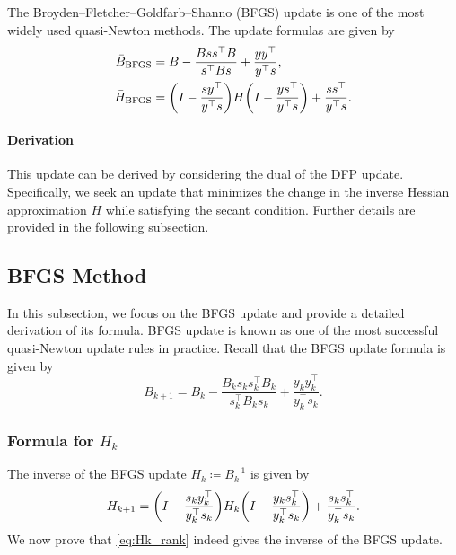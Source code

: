 \documentclass[0_en]{subfiles}
\begin{document}
The Broyden--Fletcher--Goldfarb--Shanno (BFGS) update is one of the most widely used quasi-Newton methods. The update formulas are given by
\begin{align}
    \bar{B}_{\mathrm{BFGS}} & = B - \frac{B s s^\top B}{s^\top B s} + \frac{y y^\top}{y^\top s}, \label{eq:bfgs-b-update-brief}                                       \\
    \bar{H}_{\mathrm{BFGS}} & = \qty(I - \frac{s y^\top}{y^\top s}) H \qty(I - \frac{y s^\top}{y^\top s}) + \frac{s s^\top}{y^\top s}. \label{eq:bfgs-h-update-brief}
\end{align}

\paragraph{Derivation}

This update can be derived by considering the dual of the DFP update. Specifically, we seek an update that minimizes the change in the inverse Hessian approximation $H$ while satisfying the secant condition. Further details are provided in the following subsection.

\subsection{BFGS Method}

In this subsection, we focus on the BFGS update and provide a detailed derivation of its formula.
BFGS update is known as one of the most successful quasi-Newton update rules in practice.
Recall that the BFGS update formula is given by
\begin{equation}
    B_{k+1}   = B_k - \frac{B_k s_k s_k^\top B_k}{s_k^\top B_k s_k} + \frac{y_k y_k^\top}{y_k^\top s_k}. \label{eq:Bk_rank}
\end{equation}

\subsubsection{Formula for \texorpdfstring{$H_k$}{Hk}}

The inverse of the BFGS update $H_k \coloneqq B_k^{-1}$ is given by
\begin{equation}
    H_{k+1} = \qty(I - \frac{s_k y_k^\top}{y_k^\top s_k}) H_k \qty(I - \frac{y_k s_k^\top}{y_k^\top s_k}) + \frac{s_k s_k^\top}{y_k^\top s_k}. \label{eq:Hk_rank}
\end{equation}
We now prove that \cref{eq:Hk_rank} indeed gives the inverse of the BFGS update.
\end{document}
